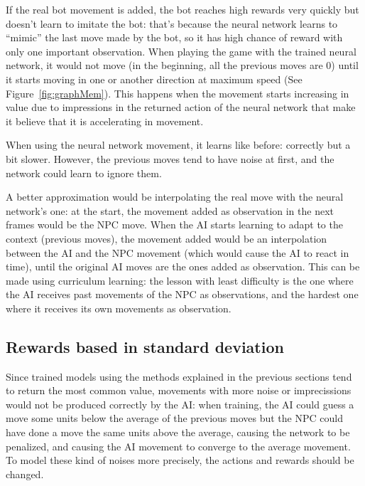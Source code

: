 If the real bot movement is added, the bot reaches high rewards very quickly but doesn't learn to imitate the bot: that's because the neural network learns to ``mimic'' the last move made by the bot, so it has high chance of reward with only one important observation. When playing the game with the trained neural network, it would not move (in the beginning, all the previous moves are 0) until it starts moving in one or another direction at maximum speed (See Figure~\ref{fig:graphMem}). This happens when the movement starts increasing in value due to impressions in the returned action of the neural network that make it believe that it is accelerating in movement.

When using the neural network movement, it learns like before: correctly but a bit slower. However, the previous moves tend to have noise at first, and the network could learn to ignore them.

A better approximation would be interpolating the real move with the neural network's one: at the start, the movement added as observation in the next frames would be the NPC move. When the AI starts learning to adapt to the context (previous moves), the movement added would be an interpolation between the AI and the NPC movement (which would cause the AI to react in time), until the original AI moves are the ones added as observation. This can be made using curriculum learning: the lesson with least difficulty is the one where the AI receives past movements of the NPC as observations, and the hardest one where it receives its own movements as observation.

\subsection{Rewards based in standard deviation}
\label{sec:stdrew}

Since trained models using the methods explained in the previous sections tend to return the most common value, movements with more noise or imprecissions would not be produced correctly by the AI: when training, the AI could guess a move some units below the average of the previous moves but the NPC could have done a move the same units above the average, causing the network to be penalized, and causing the AI movement to converge to the average movement. To model these kind of noises more precisely, the actions and rewards should be changed.

